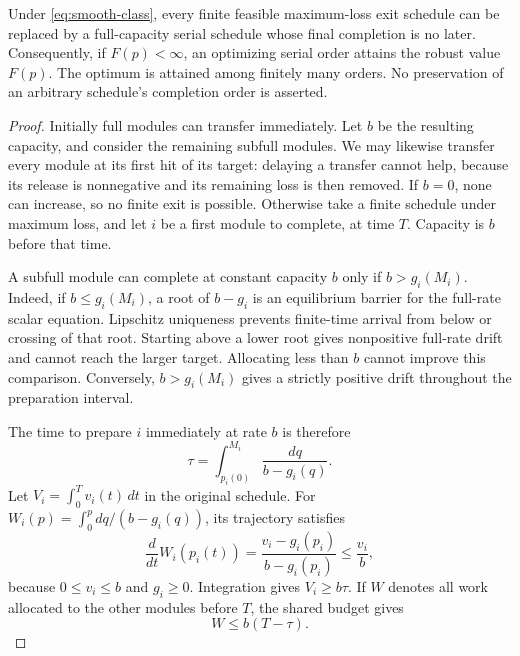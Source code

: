 \begin{theorem}
\label{thm:seriality}
Under \eqref{eq:smooth-class}, every finite feasible maximum-loss exit schedule
can be replaced by a full-capacity serial schedule whose final completion is
no later. Consequently, if \(F(p)<\infty\), an optimizing serial order attains
the robust value \(F(p)\). The optimum is attained among finitely many orders.
No preservation of an arbitrary schedule's completion order is asserted.
\end{theorem}
\begin{proof}
Initially full modules can transfer immediately. Let \(b\) be the resulting
capacity, and consider the remaining subfull modules. We may likewise transfer
every module at its first hit of its target: delaying a transfer cannot help,
because its release is nonnegative and its remaining loss is then removed.
If \(b=0\), none can
increase, so no finite exit is possible. Otherwise take a finite schedule
under maximum loss, and let \(i\) be a first module to complete, at time \(T\).
Capacity is \(b\) before that time.

A subfull module can complete at constant capacity \(b\) only if
\(b>g_i(M_i)\). Indeed, if \(b\leq g_i(M_i)\), a root of \(b-g_i\) is an
equilibrium barrier for the full-rate scalar equation. Lipschitz uniqueness
prevents finite-time arrival from below or crossing of that root. Starting
above a lower root gives nonpositive full-rate drift and cannot reach the
larger target. Allocating less than \(b\) cannot improve this comparison.
Conversely, \(b>g_i(M_i)\) gives a strictly positive drift throughout the
preparation interval.

The time to prepare \(i\) immediately at rate \(b\) is therefore
\[
 \tau=\int_{p_i(0)}^{M_i}\frac{dq}{b-g_i(q)}.
\]
Let \(V_i=\int_0^T v_i(t)\,dt\) in the original schedule. For
\(W_i(p)=\int_0^p dq/(b-g_i(q))\), its trajectory satisfies
\[
 \frac{d}{dt}W_i(p_i(t))
 =\frac{v_i-g_i(p_i)}{b-g_i(p_i)}
 \leq\frac{v_i}{b},
\]
because \(0\leq v_i\leq b\) and \(g_i\geq0\). Integration gives
\(V_i\geq b\tau\). If \(W\) denotes all work allocated to the other modules
before \(T\), the shared budget gives
\begin{equation}
 W\leq b(T-\tau).
 \label{eq:first-stage-work}
\end{equation}


\end{proof}
